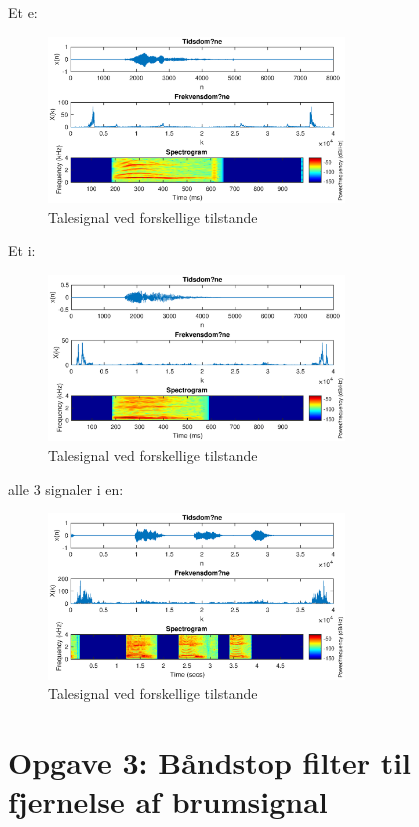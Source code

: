 \documentclass[a4paper]{report}
\begin{document}
Et e: 
\begin{figure}[H] 
\centering
\includegraphics[width=0.7\textwidth]{grafer/opg2_e}
\caption{Talesignal ved forskellige tilstande} \label{opg2_e}
\end{figure}

Et i: 
\begin{figure}[H] 
\centering
\includegraphics[width=0.7\textwidth]{grafer/opg2_i}
\caption{Talesignal ved forskellige tilstande} \label{opg2_i}
\end{figure}

alle 3 signaler i en: 


\begin{figure}[H] 
\centering
\includegraphics[width=0.7\textwidth]{grafer/opg2_all}
\caption{Talesignal ved forskellige tilstande} \label{opg2_all}
\end{figure}



\section*{Opgave 3: Båndstop filter til fjernelse af brumsignal}
\end{document}
